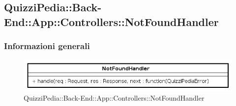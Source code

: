 \subsection{QuizziPedia::Back-End::App::Controllers::NotFoundHandler}
\subsubsection{Informazioni generali}
\label{QuizziPedia::Back-End::App::Controllers::NotFoundHandler}
\begin{figure}[ht]
	\centering
	\includegraphics[scale=0.45]{UML/Package/QuizziPedia_Back-End_App_Controllers_notFoundHandler.png}
	\caption{QuizziPedia::Back-End::App::Controllers::NotFoundHandler}
\end{figure}
\FloatBarrier
